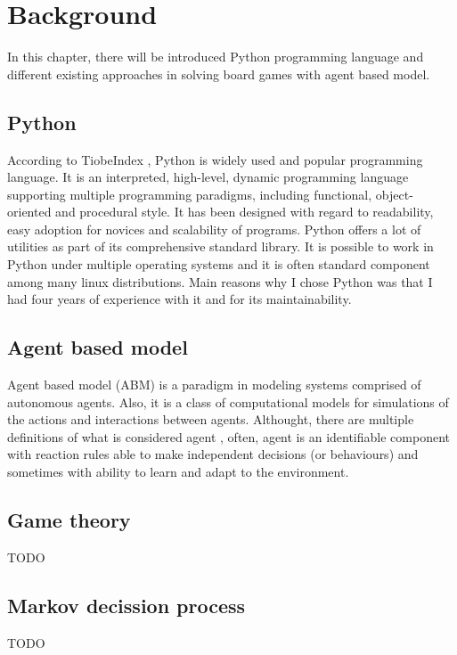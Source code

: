 \chapter{Background}\label{chap:2}
  In this chapter, there will be introduced Python programming language and
different existing approaches in solving board games with agent based model.

\section{Python}
According to TiobeIndex \cite{tiobeIndex}, Python is widely used and popular
programming language. It is an interpreted, high-level, dynamic programming
language supporting multiple programming paradigms, including functional,
object-oriented and procedural style. It has been designed with regard to
readability, easy adoption for novices and scalability of programs. Python
offers a lot of utilities as part of its comprehensive standard library. It is
possible to work in Python under multiple operating systems and it is often
standard component among many linux distributions. Main reasons why I chose
Python was that I had four years of experience with it and for its
maintainability.

\section{Agent based model}
Agent based model (ABM) is a paradigm in modeling systems comprised
of autonomous agents. Also, it is a class of computational models for
simulations of the actions and interactions between agents. Althought, there
are multiple definitions of what is considered agent \cite{abm}, often, agent
is an identifiable component with reaction rules able to make independent
decisions (or behaviours) and sometimes with ability to learn and adapt to
the environment.

\section{Game theory}
TODO

\section{Markov decission process}
TODO

